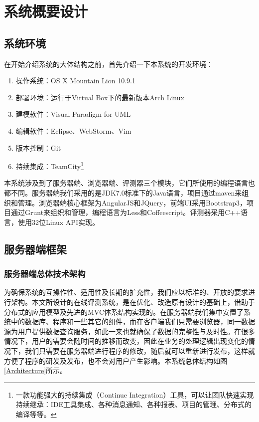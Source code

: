 
\chapter{系统概要设计}
\section{系统环境}
在开始介绍系统的大体结构之前，首先介绍一下本系统的开发环境：
\begin{enumerate}
	\item 操作系统：OS X Mountain Lion 10.9.1
	\item 部署环境：运行于Virtual Box下的最新版本Arch Linux
	\item 建模软件：Visual Paradigm for UML
	\item 编辑软件：Eclipse、WebStorm、Vim
	\item 版本控制：Git
	\item 持续集成：TeamCity\footnote{一款功能强大的持续集成（Continue Integration）工具，可以让团队快速实现持续继承：IDE工具集成、各种消息通知、各种报表、项目的管理、分布式的编译等等。}
\end{enumerate}

本系统涉及到了服务器端、浏览器端、评测器三个模块，它们所使用的编程语言也都不同。服务器端我们采用的是JDK7.0标准下的Java语言，项目通过maven来组织和管理。浏览器端核心框架为AngularJS和JQuery，前端UI采用Bootstrap3，项目通过Grunt来组织和管理，编程语言为Less和Coffeescript。评测器采用C++语言，使用32位Linux API实现。

\section{服务器端框架}
\subsection{服务器端总体技术架构}
为确保系统的互操作性、适用性及长期的扩充性，我们应以标准的、开放的要求进行架构。本文所设计的在线评测系统，是在优化、改造原有设计的基础上，借助于分布式的应用模型及先进的MVC体系结构实现的。在服务器端我们集中安置了系统中的数据库、程序和一些其它的组件，而在客户端我们只需要浏览器，同一数据源为用户提供数据查询服务，如此一来也就确保了数据的完整性与及时性。在很多情况下，用户的需要会随时间的推移而改变，因此在业务的处理逻辑出现变化的情况下，我们只需要在服务器端进行程序的修改，随后就可以重新进行发布，这样就方便了程序的研发及发布，也不会对用户产生影响。本系统总体结构如图\ref{Architecture}所示。

